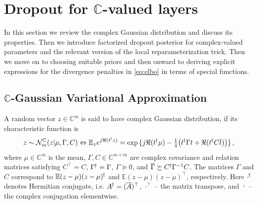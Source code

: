 \documentclass[a4paper,10pt]{article}
\newcommand{\cplx}{\mathbb{C}}
\newcommand{\hop}{{\mkern-1.5mu\dagger}}
\newcommand{\conj}[1]{\overline{#1}}
\begin{document}


\section{Dropout for $\cplx$-valued layers} %
\label{sec:dropout_for_c_valued_layers}

In this section we review the complex Gaussian distribution and discuss its properties. Then
we introduce factorized dropout posterior for complex-valued parameters and the relevant
version of the local reparameterization trick. Then we move on to choosing suitable priors
and then onward to deriving explicit expressions for the divergence penalties in \eqref{eq:elbo}
in terms of special functions.

\subsection{$\cplx$-Gaussian Variational Approximation} %
\label{sub:c_gaussian_variational_approximation}

A random vector $z\in \cplx^m$ is said to have complex Gaussian distribution, if its
characteristic function is
$$
z \sim \mathcal{N}^{\cplx}_m(z \vert \mu, \Gamma, C)
  \Leftrightarrow
  \mathbb{E}_{z} e^{j \Re{(t^{\hop} z)}}
  = \exp{\{
    j \Re{(t^{\hop} \mu)}
    - \tfrac14 \bigl(
      t^{\hop} \Gamma t + \Re{(t^{\hop} C \conj{t})}
    \bigr)
  \}}
  \,, $$
where $\mu \in \cplx^m$ is the mean, $\Gamma, C \in \cplx^{m\times m}$ are complex covariance
and relation matrices satisfying $C^\top = C$, $\Gamma^{\hop} = \Gamma$, $\Gamma \succeq 0$,
and $
  \conj{\Gamma} \succeq C^{\hop} \Gamma^{-1} C
$. The matrices $\Gamma$ and $C$ correspond to $
  \mathbb{E} (z - \mu)(z - \mu)^{\hop}
$ and $
  \mathbb{E} (z - \mu)(z - \mu)^\top
$, respectively. Here ${\cdot}^{\hop}$ denotes Hermitian conjugate, i.e. $
  A^{\hop} = (\conj{A})^\top
$, ${\cdot}^{\top}$ -- the matrix transpose, and $\conj{\cdot}$ -- the complex conjugation
elementwise.
%
\end{document}

